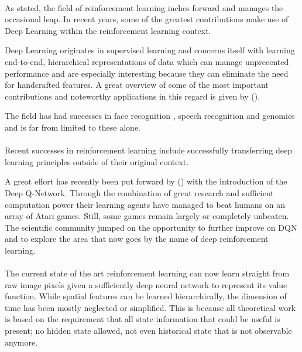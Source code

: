 \paragraph{}
As stated,
the field of reinforcement learning
inches forward and manages the occasional leap.
In recent years,
some of the greatest contributions
make use of Deep Learning
within the reinforcement learning context.

Deep Learning originates in supervised learning
and concerns itself with learning
end-to-end, hierarchical representations of data
which can manage unprecented performance
and are especially interesting
because they can eliminate the need for handcrafted features.
A great overview of
some of the most important contributions
and noteworthy applications
in this regard is given by
\citeauthor{Y.2015a} (\citeyear{Y.2015a}).

The field has had successes in
face recognition
\parencite{lawrence1997face,wolf2014deepface},
speech recognition
\parencite{dahl2012context,graves2013speech}
and
genomics
\parencite{leung2014deep,xiong2015human}
and is far from limited to these alone.

\paragraph{}
Recent successes in reinforcement learning
include successfully transferring deep learning principles
outside of their original context.

A great effort has recently been put forward by
\citeauthor{Mnih2015} (\citeyear{Mnih2013,Mnih2015})
with the introduction of the Deep Q-Network.
Through the combination of great research and sufficient computation power
their learning agents have managed to beat humans
on an array of Atari games.
Still, some games remain largely or completely unbeaten.
The scientific community jumped
on the opportunity to further improve on DQN
and to explore the area
that now goes by the name of deep reinforcement learning.

\paragraph{}
The current state of the art reinforcement learning
can now learn straight from raw image pixels
given a sufficiently deep neural network
to represent its value function.
While spatial features can be learned hierarchically,
the dimension of time has been mostly neglected or simplified.
This is because all theoretical work is based
on the requirement that all state information that
could be useful is present;
no hidden state allowed,
not even historical state that is not observable anymore.

